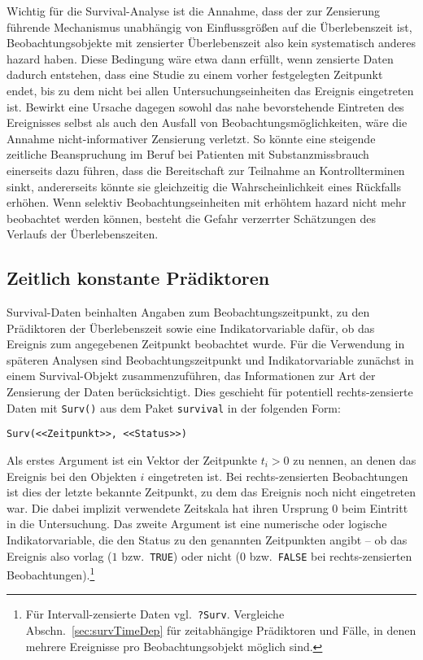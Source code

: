 Wichtig für die Survival-Analyse ist die Annahme, dass der zur Zensierung führende Mechanismus unabhängig von Einflussgrößen auf die Überlebenszeit ist, Beobachtungsobjekte mit zensierter Überlebenszeit also kein systematisch anderes hazard haben. Diese Bedingung wäre etwa dann erfüllt, wenn zensierte Daten dadurch entstehen, dass eine Studie zu einem vorher festgelegten Zeitpunkt endet, bis zu dem nicht bei allen Untersuchungseinheiten das Ereignis eingetreten ist. Bewirkt eine Ursache dagegen sowohl das nahe bevorstehende Eintreten des Ereignisses selbst als auch den Ausfall von Beobachtungsmöglichkeiten, wäre die Annahme nicht-informativer Zensierung verletzt. So könnte eine steigende zeitliche Beanspruchung im Beruf bei Patienten mit Substanzmissbrauch einerseits dazu führen, dass die Bereitschaft zur Teilnahme an Kontrollterminen sinkt, andererseits könnte sie gleichzeitig die Wahrscheinlichkeit eines Rückfalls erhöhen. Wenn selektiv Beobachtungseinheiten mit erhöhtem hazard nicht mehr beobachtet werden können, besteht die Gefahr verzerrter Schätzungen des Verlaufs der Überlebenszeiten.

\subsection{Zeitlich konstante Prädiktoren}
\label{sec:survTimeInd}

Survival-Daten beinhalten Angaben zum Beobachtungszeitpunkt, zu den Prädiktoren der Überlebenszeit sowie eine Indikatorvariable dafür, ob das Ereignis zum angegebenen Zeitpunkt beobachtet wurde. Für die Verwendung in späteren Analysen sind Beobachtungszeitpunkt und Indikatorvariable zunächst in einem Survival-Objekt zusammenzuführen, das Informationen zur Art der Zensierung der Daten berücksichtigt. Dies geschieht für potentiell rechts-zensierte Daten mit \lstinline!Surv()! aus dem Paket \lstinline!survival! in der folgenden Form:
\begin{lstlisting}
Surv(<<Zeitpunkt>>, <<Status>>)
\end{lstlisting}

Als erstes Argument ist ein Vektor der Zeitpunkte $t_{i} > 0$ zu nennen, an denen das Ereignis bei den Objekten $i$ eingetreten ist. Bei rechts-zensierten Beobachtungen ist dies der letzte bekannte Zeitpunkt, zu dem das Ereignis noch nicht eingetreten war. Die dabei implizit verwendete Zeitskala hat ihren Ursprung $0$ beim Eintritt in die Untersuchung. Das zweite Argument ist eine numerische oder logische Indikatorvariable, die den Status zu den genannten Zeitpunkten angibt -- ob das Ereignis also vorlag ($1$ bzw.\ \lstinline!TRUE!) oder nicht ($0$ bzw.\ \lstinline!FALSE! bei rechts-zensierten Beobachtungen).\footnote{Für Intervall-zensierte Daten vgl.\ \lstinline!?Surv!. Vergleiche Abschn.\ \ref{sec:survTimeDep} für zeitabhängige Prädiktoren und Fälle, in denen mehrere Ereignisse pro Beobachtungsobjekt möglich sind.}

